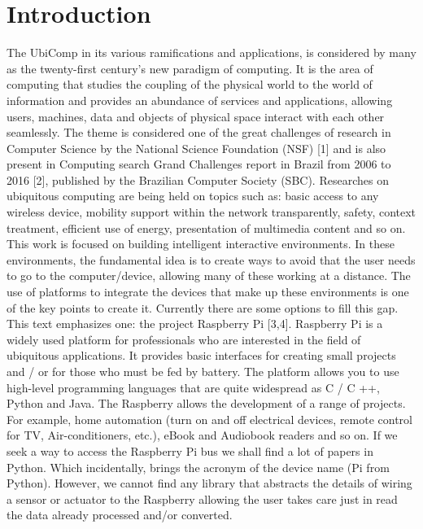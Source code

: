 \documentclass{acm_proc_article-sp}
\begin{document}
\section{Introduction}
The UbiComp in its various ramifications and applications, is considered by many as the twenty-first century's new paradigm of computing. It is the area of computing that studies the coupling of the physical world to the world of information and provides an abundance of services and applications, allowing users, machines, data and objects of physical space interact with each other seamlessly. The theme is considered one of the great challenges of research in Computer Science by the National Science Foundation (NSF) [1] and is also present in Computing search Grand Challenges report in Brazil from 2006 to 2016 [2], published by the Brazilian Computer Society (SBC).
\newline
\newline
Researches on ubiquitous computing are being held on topics such as: basic access to any wireless device, mobility support within the network transparently, safety, context treatment, efficient use of energy, presentation of multimedia content and so on. This work is focused on building intelligent interactive environments. In these environments, the fundamental idea is to create ways to avoid that the user needs to go to the computer/device, allowing many of these working at a distance. The use of platforms to integrate the devices that make up these environments is one of the key points to create it. Currently there are some options to fill this gap. This text emphasizes one: the project Raspberry Pi [3,4].
\newline
\newline
Raspberry Pi is a widely used platform for professionals who are interested in the field of ubiquitous applications. It provides basic interfaces for creating small projects and / or for those who must be fed by battery. The platform allows you to use high-level programming languages that are quite widespread as C / C ++, Python and Java. The Raspberry allows the development of a range of projects. For example, home automation (turn on and off electrical devices, remote control for TV, Air-conditioners, etc.), eBook and Audiobook readers and so on.
\newline
\newline
If we seek a way to access the Raspberry Pi bus we shall find a lot of papers in Python. Which incidentally, brings the acronym of the device name (Pi from Python). However, we cannot find any library that abstracts the details of wiring a sensor or actuator to the Raspberry allowing the user takes care just in read the data already processed and/or converted.
\end{document}

